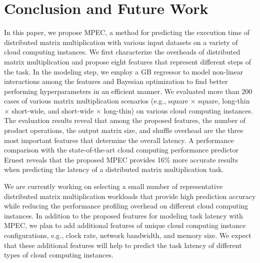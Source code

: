 \documentclass[10pt, conference, compsocconf]{IEEEtran}
\begin{document}
\section{Conclusion and Future Work}
In this paper, we propose MPEC, a method for predicting the execution time of distributed matrix multiplication with various input datasets on a variety of cloud computing instances. We first characterize the overheads of distributed matrix multiplication and propose eight features that represent different steps of the task. In the modeling step, we employ a GB regressor to model non-linear interactions among the features and Bayesian optimization to find better performing hyperparameters in an efficient manner. We evaluated more than 200 cases of various matrix multiplication scenarios (e.g., square $\times$ square, long-thin $\times$ short-wide, and short-wide $\times$ long-thin) on various cloud computing instances. The evaluation results reveal that among the proposed features, the number of product operations, the output matrix size, and shuffle overhead are the three most important features that determine the overall latency. A performance comparison with the state-of-the-art cloud computing performance predictor Ernest reveals that the proposed MPEC provides 16\% more accurate results when predicting the latency of a distributed matrix multiplication task.

We are currently working on selecting a small number of representative distributed matrix multiplication workloads that provide high prediction accuracy while reducing the performance profiling overhead on different cloud computing instances. In addition to the proposed features for modeling task latency with MPEC, we plan to add additional features of unique cloud computing instance configurations, e.g., clock rate, network bandwidth, and memory size. We expect that these additional features will help to predict the task latency of different types of cloud computing instances.


\end{document}

